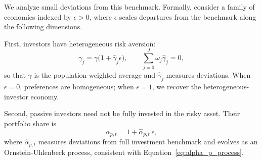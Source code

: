 We analyze small deviations from this benchmark. Formally, consider a family of economies indexed by $\epsilon>0$, where $\epsilon$ scales departures from the benchmark along the following dimensions.

First, investors have heterogeneous risk aversion:
\begin{equation}\label{eq:gamma-perturb}
    \gamma_j=\gamma\big(1+\hat{\gamma}_j\epsilon\big), 
    \qquad
    \sum_{j=0}^J \omega_j \hat{\gamma}_j=0,
\end{equation}
so that $\gamma$ is the population-weighted average and $\hat{\gamma}_j$ measures deviations. When $\epsilon=0$, preferences are homogeneous; when $\epsilon=1$, we recover the heterogeneous-investor economy.



Second, passive investors need not be fully invested in the risky asset. Their portfolio share is  
\begin{equation}\label{eq:apbar_index}
    \overline{\alpha}_{p,t}=1+\hat{\alpha}_{p,t}\,\epsilon,
\end{equation}
where $\hat{\alpha}_{p,t}$ measures deviations from full investment benchmark and evolves as an Ornstein-Uhlenbeck process, consistent with Equation~\eqref{eq:alpha_p_process}.


